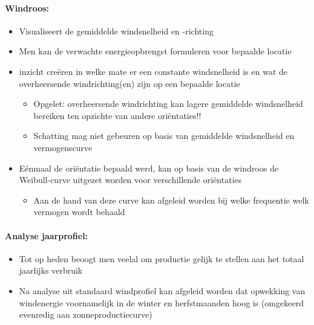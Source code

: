 \documentclass[12pt]{article}
\begin{document}
\paragraph{Windroos:}
\begin{itemize}
    \item Visualiseert de gemiddelde windsnelheid en -richting
    \item Men kan de verwachte energieopbrengst formuleren voor bepaalde locatie
    \item inzicht creëren in welke mate er een constante windsnelheid is en wat de overheersende windrichting(en) zijn op een bepaalde locatie\begin{itemize}
        \item Opgelet: overheersende windrichting kan lagere gemiddelde windsnelheid bereiken ten opzichte van andere oriëntaties!!
        \item Schatting mag niet gebeuren op basis van gemiddelde windsnelheid en vermogenscurve
    \end{itemize}
    \item Eénmaal de oriëntatie bepaald werd, kan op basis van de windroos de Weibull-curve uitgezet worden voor verschillende oriëntaties\begin{itemize}
        \item Aan de hand van deze curve kan afgeleid worden bij welke frequentie welk vermogen wordt behaald
    \end{itemize}
\end{itemize}
\paragraph{Analyse jaarprofiel:}
\begin{itemize}
    \item Tot op heden beoogt men veelal om productie gelijk te stellen aan het totaal jaarlijks verbruik
    \item Na analyse uit standaard windprofiel kan afgeleid worden dat opwekking van windenergie voornamelijk in de winter en herfstmaanden hoog is (omgekeerd evenredig aan zonneproductiecurve)    
\end{itemize}
\end{document}

